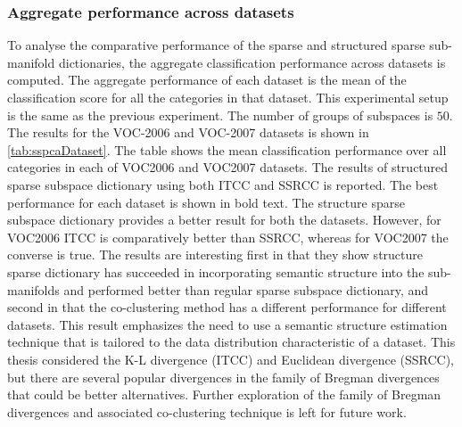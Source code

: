 \subsubsection{Aggregate performance across datasets}
To analyse the comparative performance of the sparse and structured sparse sub-manifold dictionaries, the aggregate classification performance across datasets is computed. The aggregate performance of each dataset is the mean of the classification score for all the categories in that dataset. This experimental setup is the same as the previous experiment. The number of groups of subspaces is $50$. The results for the VOC-2006 and VOC-2007 datasets is shown in \cref{tab:sspcaDataset}. The table shows the mean classification performance over all categories in each of VOC2006 and VOC2007 datasets. The results of structured sparse subspace dictionary using both ITCC and SSRCC is reported. The best performance for each dataset is shown in bold text. The structure sparse subspace dictionary provides a better result for both the datasets. However, for VOC2006 ITCC is comparatively better than SSRCC, whereas for VOC2007 the converse is true. The results are interesting first in that they show structure sparse 
dictionary has succeeded in incorporating semantic structure into the sub-manifolds and performed better than regular sparse subspace dictionary, and second in that the co-clustering method has a different performance for different datasets. This result emphasizes the need to use a semantic structure estimation technique that is tailored to the data distribution characteristic of a dataset. This thesis considered the K-L divergence (ITCC) and Euclidean divergence (SSRCC), but there are several popular divergences in the family of Bregman divergences that could be better alternatives. Further exploration of the family of Bregman divergences and associated co-clustering technique is left for future work.

